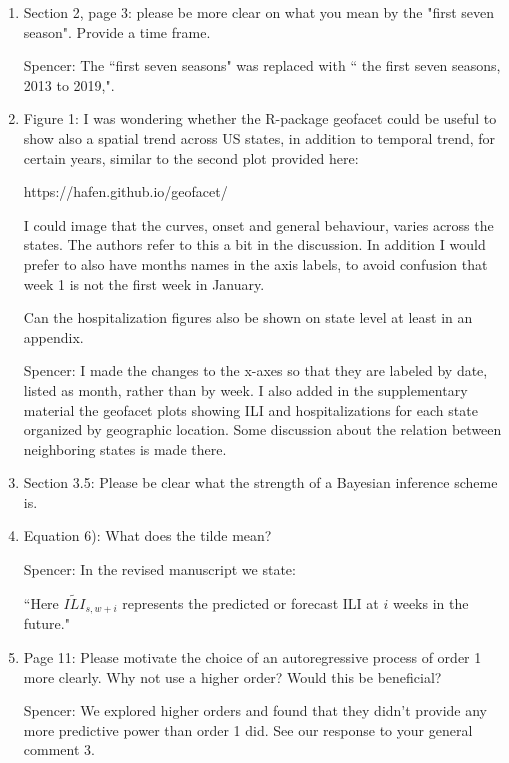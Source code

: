 \documentclass{article}
\newcommand{\spencer}[1]{{\color{blue} Spencer: #1}}
\begin{document}
\begin{enumerate}[-]

\item Section 2, page 3: please be more clear on what you mean by the 
"first seven season". Provide a time frame.

\spencer{The ``first seven seasons" was replaced with 
`` the first seven seasons, 2013 to 2019,".} 

\item Figure 1: I was wondering whether the R-package geofacet could be useful to 
show also a spatial trend across US states, in addition to temporal trend, for 
certain years,  similar to the second plot provided here:

https://hafen.github.io/geofacet/

I could image that the curves, onset and general behaviour, varies across the 
states. The authors refer to this a bit in the discussion. In addition I would 
prefer to also have months names in the axis labels, to avoid confusion that 
week 1 is not the first week in January.

Can the hospitalization figures also be shown on state level at least in an appendix.

\spencer{I made the changes to the x-axes so that they are labeled by date, 
listed as month, rather than by week. I also added in the 
supplementary material the geofacet plots showing 
ILI and hospitalizations for each state organized by geographic location. Some
discussion about the relation between neighboring states is made there.}

\item Section 3.5: Please be clear what the strength of a Bayesian inference scheme is. 

\item Equation 6): What does the tilde mean?

\spencer{In the revised manuscript we state:

``Here $\widetilde{ILI}_{s,w + i}$ represents the 
predicted or forecast ILI at $i$ weeks in the future."}

\item Page 11: Please motivate the choice of an autoregressive process of order 1 
more clearly. Why not use a higher order? Would this be beneficial?


\spencer{We explored higher orders and found that they didn't provide any more
predictive power than order 1 did. See our response to your general comment 3.}


\end{enumerate}
\end{document}
